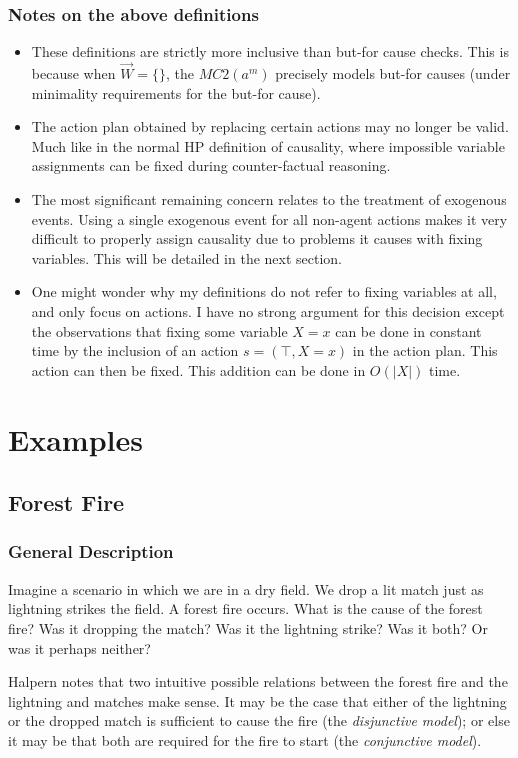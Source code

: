 \documentclass{article}
\theoremstyle{plain}
\theoremstyle{definition}
\begin{document}
\subsubsection*{Notes on the above definitions}
\begin{itemize}
\item These definitions are strictly more inclusive than but-for cause checks. This is because when $\vec{W}=\{\}$, the $MC2(a^m)$ precisely models but-for causes (under minimality requirements for the but-for cause).
\item The action plan obtained by replacing certain actions may no longer be valid. Much like in the normal HP definition of causality, where impossible variable assignments can be fixed during counter-factual reasoning.
\item The most significant remaining concern relates to the treatment of exogenous events. Using a single exogenous event for all non-agent actions makes it very difficult to properly assign causality due to problems it causes with fixing variables. This will be detailed in the next section.
\item One might wonder why my definitions do not refer to fixing variables at all, and only focus on actions. I have no strong argument for this decision except the observations that fixing some variable $X=x$ can be done in constant time by the inclusion of an action $s=(\top,X=x)$ in the action plan. This action can then be fixed. This addition can be done in $O(|X|)$ time.
\end{itemize}


\section{Examples} \label{sec:examples}
\subsection{Forest Fire} \label{sec:forestFire}
\subsubsection*{General Description}
Imagine a scenario in which we are in a dry field. We drop a lit match just as lightning strikes the field. A forest fire occurs. What is the cause of the forest fire? Was it dropping the match? Was it the lightning strike? Was it both? Or was it perhaps neither?

Halpern notes that two intuitive possible relations between the forest fire and the lightning and matches make sense. It may be the case that either of the lightning or the dropped match is sufficient to cause the fire (the \textit{disjunctive model}); or else it may be that both are required for the fire to start (the \textit{conjunctive model}).
\end{document}
